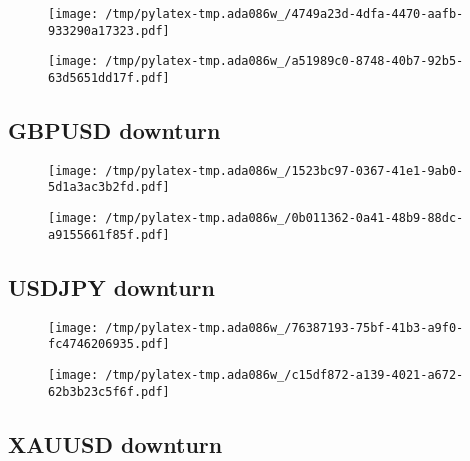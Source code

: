 \documentclass{article}%
\begin{document}
\begin{figure}[htbp]%
\centering%
\texttt{[image: /tmp/pylatex-tmp.ada086w\_/4749a23d-4dfa-4470-aafb-933290a17323.pdf]}%
\end{figure}

%


\begin{figure}[htbp]%
\centering%
\texttt{[image: /tmp/pylatex-tmp.ada086w\_/a51989c0-8748-40b7-92b5-63d5651dd17f.pdf]}%
\end{figure}

%
\newpage %
\subsection{GBPUSD downturn}%
\label{subsec:GBPUSDdownturn}%


\begin{figure}[htbp]%
\centering%
\texttt{[image: /tmp/pylatex-tmp.ada086w\_/1523bc97-0367-41e1-9ab0-5d1a3ac3b2fd.pdf]}%
\end{figure}

%


\begin{figure}[htbp]%
\centering%
\texttt{[image: /tmp/pylatex-tmp.ada086w\_/0b011362-0a41-48b9-88dc-a9155661f85f.pdf]}%
\end{figure}

%
\newpage %
\subsection{USDJPY downturn}%
\label{subsec:USDJPYdownturn}%


\begin{figure}[htbp]%
\centering%
\texttt{[image: /tmp/pylatex-tmp.ada086w\_/76387193-75bf-41b3-a9f0-fc4746206935.pdf]}%
\end{figure}

%


\begin{figure}[htbp]%
\centering%
\texttt{[image: /tmp/pylatex-tmp.ada086w\_/c15df872-a139-4021-a672-62b3b23c5f6f.pdf]}%
\end{figure}

%
\newpage %
\subsection{XAUUSD downturn}%
\label{subsec:XAUUSDdownturn}%
\end{document}
